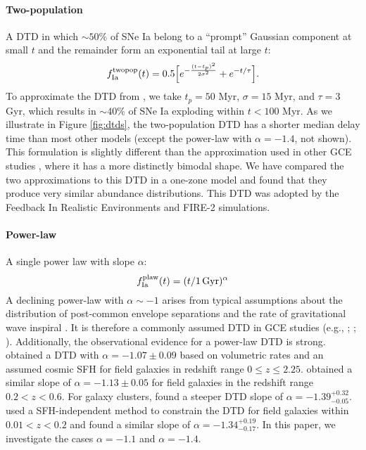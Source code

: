 \documentclass[twocolumn,twocolappendix,linenumbers]{aastex631}
\begin{document}
\paragraph{Two-population} A DTD in which $\sim50\%$ of SNe Ia belong to a ``prompt'' Gaussian component at small $t$ and the remainder form an exponential tail at large $t$:
\begin{equation}
    f_{\rm Ia}^{\rm twopop}(t) = 0.5\Big[e^{-\frac{(t-t_p)^2}{2\sigma^2}} + e^{-t/\tau}\Big].
    \label{eq:prompt-dtd}
\end{equation}
To approximate the DTD from \citet{Mannucci2006-TwoPopulations}, we take $t_p=50$ Myr, $\sigma=15$ Myr, and $\tau=3$ Gyr, which results in $\sim 40\%$ of SNe Ia exploding within $t<100$ Myr. As we illustrate in Figure \ref{fig:dtds}, the two-population DTD has a shorter median delay time than most other models (except the power-law with $\alpha=-1.4$, not shown).
This formulation is slightly different than the approximation used in other GCE studies \citep[e.g.,][]{Matteucci2006-BimodalDTDConsequences,Poulhazan2018-PrecisionPollution}, where it has a more distinctly bimodal shape. We have compared the two approximations to this DTD in a one-zone model and found that they produce very similar abundance distributions. This DTD was adopted by the Feedback In Realistic Environments \citep[FIRE;][]{Hopkins2014-FIRE-1} and FIRE-2 \citep{Hopkins2018-FIRE-2} simulations.

\paragraph{Power-law} A single power law with slope $\alpha$:
\begin{equation}
    f_{\rm Ia}^{\rm plaw}(t) = (t/1\,\rm{Gyr})^\alpha
    \label{eq:powerlaw-dtd}
\end{equation}
A declining power-law with $\alpha\sim-1$ arises from typical assumptions about the distribution of post-common envelope separations and the rate of gravitational wave inspiral \citep[see Section 3.5 from][]{Maoz2014-Review}. It is therefore a commonly assumed DTD in GCE studies (e.g., \citealt{Rybizki2017-Chempy}; ; \citealt{Weinberg2023-CCSNYield}). Additionally, the observational evidence for a power-law DTD is strong. \citet{Maoz2017-CosmicDTD} obtained a DTD with $\alpha=-1.07\pm0.09$ based on volumetric rates and an assumed cosmic SFH for field galaxies in redshift range $0\leq z\leq 2.25$. \citet{Wiseman2021-DESRates} obtained a similar slope of $\alpha=-1.13\pm0.05$ for field galaxies in the redshift range $0.2<z<0.6$. For galaxy clusters, \citet{Maoz2017-CosmicDTD} found a steeper DTD slope of $\alpha=-1.39^{+0.32}_{-0.05}$. \citet{Heringer2019-FieldGalaxyDTD} used a SFH-independent method to constrain the DTD for field galaxies within $0.01<z<0.2$ and found a similar slope of $\alpha=-1.34^{+0.19}_{-0.17}$.
In this paper, we investigate the cases $\alpha=-1.1$ and $\alpha=-1.4$.
\end{document}
